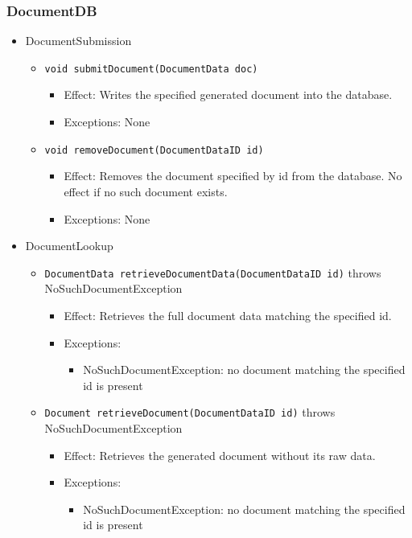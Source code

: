 \documentclass[a4paper,10pt]{article}
\begin{document}
\subsubsection*{DocumentDB}
\begin{itemize}
    \item DocumentSubmission
    \begin{itemize}
        \item \texttt{void submitDocument(DocumentData doc)}
        \begin{itemize}
            \item Effect: Writes the specified generated document into the database.
            \item Exceptions: None
        \end{itemize}

        \item \texttt{void removeDocument(DocumentDataID id)}
        \begin{itemize}
            \item Effect: Removes the document specified by id from the database. No effect if no such document exists.
            \item Exceptions: None
         \end{itemize}
    \end{itemize}

    \item DocumentLookup
    	\begin{itemize}
    		\item \texttt{DocumentData retrieveDocumentData(DocumentDataID id)} throws NoSuchDocumentException
    		\begin{itemize}
    			\item Effect: Retrieves the full document data matching the specified id.
    			\item Exceptions:
    			\begin{itemize}
    				\item NoSuchDocumentException: no document matching the specified id is present
    			\end{itemize}
    		\end{itemize}

    		\item \texttt{Document retrieveDocument(DocumentDataID id)} throws NoSuchDocumentException
    		\begin{itemize}
    			\item Effect: Retrieves the generated document without its raw data.
    			\item Exceptions:
    			\begin{itemize}
    				\item NoSuchDocumentException: no document matching the specified id is present
    			\end{itemize}
    		\end{itemize}


\end{itemize}
\end{itemize}
\end{document}
